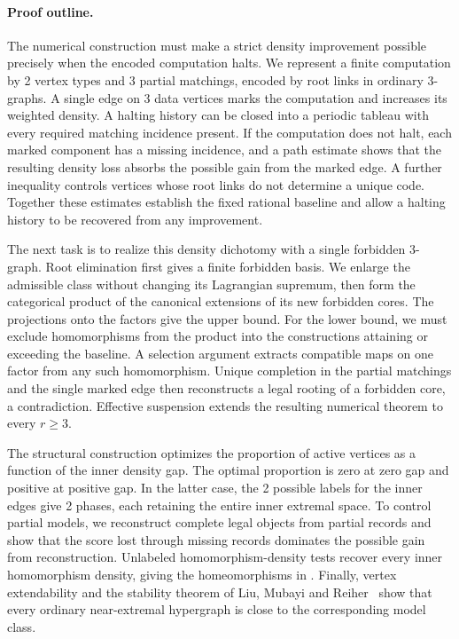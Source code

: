 \documentclass[10pt]{article}
\numberwithin{equation}{section}
\theoremstyle{definition}
\begin{document}
\paragraph{Proof outline.}
The numerical construction must make a strict density improvement possible precisely when the encoded computation halts. We represent a finite computation by 2 vertex types and 3 partial matchings, encoded by root links in ordinary $3$-graphs. A single edge on 3 data vertices marks the computation and increases its weighted density. A halting history can be closed into a periodic tableau with every required matching incidence present. If the computation does not halt, each marked component has a missing incidence, and a path estimate shows that the resulting density loss absorbs the possible gain from the marked edge. A further inequality controls vertices whose root links do not determine a unique code. Together these estimates establish the fixed rational baseline and allow a halting history to be recovered from any improvement.

The next task is to realize this density dichotomy with a single forbidden $3$-graph. Root elimination first gives a finite forbidden basis. We enlarge the admissible class without changing its Lagrangian supremum, then form the categorical product of the canonical extensions of its new forbidden cores. The projections onto the factors give the upper bound. For the lower bound, we must exclude homomorphisms from the product into the constructions attaining or exceeding the baseline. A selection argument extracts compatible maps on one factor from any such homomorphism. Unique completion in the partial matchings and the single marked edge then reconstructs a legal rooting of a forbidden core, a contradiction. Effective suspension extends the resulting numerical theorem to every $r\ge3$.

The structural construction optimizes the proportion of active vertices as a function of the inner density gap. The optimal proportion is zero at zero gap and positive at positive gap. In the latter case, the 2 possible labels for the inner edges give 2 phases, each retaining the entire inner extremal space. To control partial models, we reconstruct complete legal objects from partial records and show that the score lost through missing records dominates the possible gain from reconstruction. Unlabeled homomorphism-density tests recover every inner homomorphism density, giving the homeomorphisms in . Finally, vertex extendability and the stability theorem of Liu, Mubayi and Reiher~\cite{LMR2023} show that every ordinary near-extremal hypergraph is close to the corresponding model class.
\end{document}

